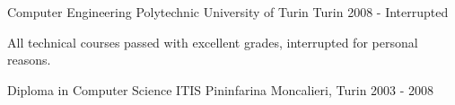 

\begin{cventries}

  \cventry
    {Computer Engineering} %
    {Polytechnic University of Turin} %
    {Turin} %
    {2008 - Interrupted} %
    {
      \begin{cvitems} %
        \item {All technical courses passed with excellent grades, interrupted for personal reasons.}
      \end{cvitems}
    }

  \cventry
    {Diploma in Computer Science} %
    {ITIS Pininfarina} %
    {Moncalieri, Turin} %
    {2003 - 2008} %
    {
      \begin{cvitems} %
      \end{cvitems}
    }

\end{cventries}

